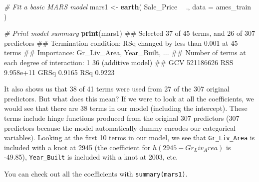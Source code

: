 \documentclass[]{book}
\newenvironment{Shaded}{\begin{snugshade}}{\end{snugshade}}
\newcommand{\CommentTok}[1]{\textcolor[rgb]{0.56,0.35,0.01}{\textit{#1}}}
\newcommand{\DataTypeTok}[1]{\textcolor[rgb]{0.13,0.29,0.53}{#1}}
\newcommand{\DecValTok}[1]{\textcolor[rgb]{0.00,0.00,0.81}{#1}}
\newcommand{\KeywordTok}[1]{\textcolor[rgb]{0.13,0.29,0.53}{\textbf{#1}}}
\newcommand{\NormalTok}[1]{#1}
\newcommand{\OperatorTok}[1]{\textcolor[rgb]{0.81,0.36,0.00}{\textbf{#1}}}
\newcommand{\StringTok}[1]{\textcolor[rgb]{0.31,0.60,0.02}{#1}}
\theoremstyle{definition}
\theoremstyle{definition}
\theoremstyle{definition}
\theoremstyle{remark}
\begin{document}
\begin{Shaded}
\begin{Highlighting}[]
\CommentTok{# Fit a basic MARS model}
\NormalTok{mars1 <-}\StringTok{ }\KeywordTok{earth}\NormalTok{(}
\NormalTok{  Sale_Price }\OperatorTok{~}\StringTok{ }\NormalTok{.,  }
  \DataTypeTok{data =}\NormalTok{ ames_train   }
\NormalTok{)}

\CommentTok{# Print model summary}
\KeywordTok{print}\NormalTok{(mars1)}
\NormalTok{## Selected 37 of 45 terms, and 26 of 307 predictors}
\NormalTok{## Termination condition: RSq changed by less than 0.001 at 45 terms}
\NormalTok{## Importance: Gr_Liv_Area, Year_Built, ...}
\NormalTok{## Number of terms at each degree of interaction: 1 36 (additive model)}
\NormalTok{## GCV 521186626    RSS 9.958e+11    GRSq 0.9165    RSq 0.9223}
\end{Highlighting}
\end{Shaded}

It also shows us that 38 of 41 terms were used from 27 of the 307
original predictors. But what does this mean? If we were to look at all
the coefficients, we would see that there are 38 terms in our model
(including the intercept). These terms include hinge functions produced
from the original 307 predictors (307 predictors because the model
automatically dummy encodes our categorical variables). Looking at the
first 10 terms in our model, we see that \texttt{Gr\_Liv\_Area} is
included with a knot at 2945 (the coefficient for
\(h(2945-Gr_Liv_Area)\) is -49.85), \texttt{Year\_Built} is included
with a knot at 2003, etc.

\begin{tip}
You can check out all the coefficients with \texttt{summary(mars1)}.
\end{tip}

\begin{Shaded}
\end{Shaded}
\end{document}
